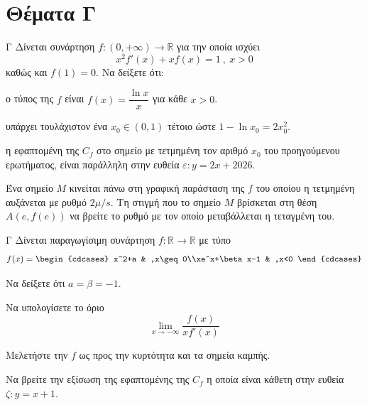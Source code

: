 \setcounter{thema}{0}
\section{Θέματα Γ}
\def\xrwma{propAccent}
\begin{thema}{Γ}
Δίνεται συνάρτηση $f:(0,+\infty)\to\mathbb{R}$ για την οποία ισχύει
\[ x^2f'(x)+xf(x)=1\ , \ x>0 \]
καθώς και $f(1)=0$. Να δείξετε ότι:
\begin{erwthma}
\item ο τύπος της $f$ είναι $f(x)=\dfrac{\ln{x}}{x}$ για κάθε $ x>0$.
\item υπάρχει τουλάχιστον ένα $x_0\in(0,1)$ τέτοιο ώστε $1-\ln{x_0}=2x_0^2$.

\item η εφαπτομένη της $C_f$ στο σημείο με τετμημένη τον αριθμό $x_0$ του προηγούμενου ερωτήματος, είναι παράλληλη στην ευθεία $\varepsilon: y = 2x + 2026$.
\item Ένα σημείο $M$ κινείται πάνω στη γραφική παράσταση της $f$ του οποίου η τετμημένη αυξάνεται με ρυθμό $2\mu/s$. Τη στιγμή που το σημείο $M$ βρίσκεται στη θέση $A(e,f(e))$ να βρείτε το ρυθμό με τον οποίο μεταβάλλεται η τεταγμένη του.
\end{erwthma}
\end{thema}
\begin{thema}{Γ}
Δίνεται παραγωγίσιμη συνάρτηση $f:\mathbb{R}\to\mathbb{R}$ με τύπο
\[ f(x)=\begin{cdcases}
x^2+a & ,x\geq0\\xe^x+\beta x-1 & ,x<0
\end{cdcases} \]
\begin{erwthma}
\item Να δείξετε ότι $a=\beta=-1$.
\item Να υπολογίσετε το όριο \[ \lim\limits_{x\to-\infty}{\frac{f(x)}{xf'(x)}} \]
\item Μελετήστε την $f$ ως προς την κυρτότητα και τα σημεία καμπής.
\item Να βρείτε την εξίσωση της εφαπτομένης της $C_f$ η οποία είναι κάθετη στην ευθεία $\zeta:y=x+1$.
\end{erwthma}
\end{thema}
